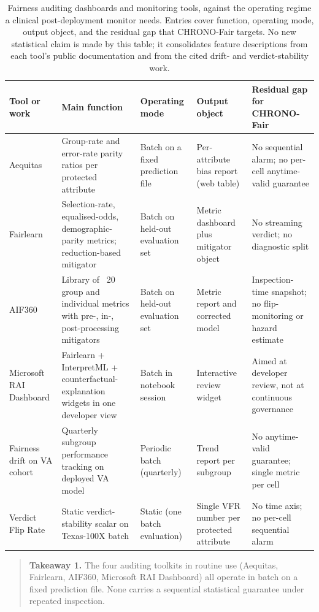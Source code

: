 \documentclass[acmsmall,nonacm,review,anonymous]{acmart}
\newcommand{\1}[1]{\mathbf{1}\!\left\{#1\right\}}
\begin{document}
\begin{table}[t]
\centering
\caption{Fairness auditing dashboards and monitoring tools, against the operating regime a clinical post-deployment monitor needs. Entries cover function, operating mode, output object, and the residual gap that CHRONO-Fair targets. No new statistical claim is made by this table; it consolidates feature descriptions from each tool's public documentation and from the cited drift- and verdict-stability work.}
\label{tab:dashboards}
\footnotesize
\begin{tabular}{p{2.4cm} p{3.6cm} p{2.4cm} p{3.4cm} p{3.6cm}}
\toprule
Tool or work & Main function & Operating mode & Output object & Residual gap for CHRONO-Fair \\
\midrule
Aequitas & Group-rate and error-rate parity ratios per protected attribute & Batch on a fixed prediction file & Per-attribute bias report (web table) & No sequential alarm; no per-cell anytime-valid guarantee \\
Fairlearn & Selection-rate, equalised-odds, demographic-parity metrics; reduction-based mitigator & Batch on held-out evaluation set & Metric dashboard plus mitigator object & No streaming verdict; no diagnostic split \\
AIF360 & Library of ~20 group and individual metrics with pre-, in-, post-processing mitigators & Batch on held-out evaluation set & Metric report and corrected model & Inspection-time snapshot; no flip-monitoring or hazard estimate \\
Microsoft RAI Dashboard & Fairlearn + InterpretML + counterfactual-explanation widgets in one developer view & Batch in notebook session & Interactive review widget & Aimed at developer review, not at continuous governance \\
Fairness drift on VA cohort \cite{davis2025} & Quarterly subgroup performance tracking on deployed VA model & Periodic batch (quarterly) & Trend report per subgroup & No anytime-valid guarantee; single metric per cell \\
Verdict Flip Rate \cite{joy2025vfr} & Static verdict-stability scalar on Texas-100X batch & Static (one batch evaluation) & Single VFR number per protected attribute & No time axis; no per-cell sequential alarm \\
\bottomrule
\end{tabular}
\end{table}

\begin{quote}
\textbf{Takeaway 1.} The four auditing toolkits in routine use (Aequitas, Fairlearn, AIF360, Microsoft RAI Dashboard) all operate in batch on a fixed prediction file. None carries a sequential statistical guarantee under repeated inspection.
\end{quote}
\end{document}
